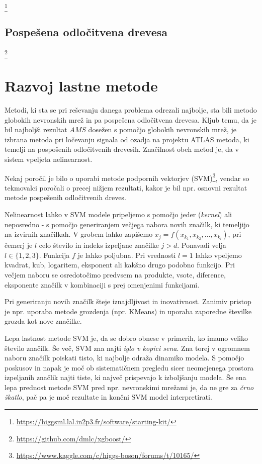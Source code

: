 \documentclass[11pt,a4paper,openany]{book}
\begin{document}
\footnote{\url{https://higgsml.lal.in2p3.fr/software/starting-kit/}}

\section{Pospešena odločitvena drevesa}

\footnote{\url{https://github.com/dmlc/xgboost/}}

	
\chapter{Razvoj lastne metode}
\label{ch:razvoj_lastne_metode}

Metodi, ki sta se pri reševanju danega problema odrezali najbolje, sta bili metodo globokih nevronskih mrež in pa pospešena odločitvena drevesa. Kljub temu, da je bil najboljši rezultat $AMS$ dosežen s pomočjo globokih nevronskih mrež, je izbrana metoda pri ločevanju signala od ozadja na projektu ATLAS metoda, ki temelji na pospošenih odločitvenih drevesih. Značilnost obeh metod je, da v sistem vpeljeta nelinearnost. 

Nekaj poročil je bilo o uporabi metode podpornih vektorjev (SVM)\footnote{\url{https://www.kaggle.com/c/higgs-boson/forums/t/10165/}}, vendar so tekmovalci poročali o precej nižjem rezultati, kakor je bil npr. osnovni rezultat metode pospešenih odločitvenih dreves.

Nelinearnost lahko v SVM modele pripeljemo s pomočjo jeder (\textit{kernel}) ali neposredno - s pomočjo generiranjem večjega nabora novih značilk, ki temeljijo na izvirnih značilkah. V grobem lahko zapišemo $x_j = f(x_{k_1}, x_{k_2}, ..., x_{k_l})$, pri čemerj je $l$ celo število in indeks izpeljane značilke $j > d$. Ponavadi velja $l \in \{1, 2, 3\}$. Funkcija $f$ je lahko poljubna. Pri vrednosti $l = 1$ lahko vpeljemo kvadrat, kub, logaritem, eksponent ali kakšno drugo podobno funkcijo. Pri večjem naboru se osredotočimo predvsem na produkte, vsote, diference, eksponente značilk v kombinaciji s prej omenjenimi funkcijami. 

Pri generiranju novih značilk šteje iznajdljivost in inovativnost. Zanimiv pristop je npr. uporaba metode grozdenja (npr. KMeans) in uporaba zaporedne številke grozda kot nove značilke.

Lepa lastnost metode SVM je, da se dobro obnese v primerih, ko imamo veliko število značilk. Še več, SVM zna najti \textit{iglo v kopici sena}. Zna torej v ogromnem naboru značilk poiskati tisto, ki najbolje odraža dinamiko modela. S pomočjo poskusov in napak je moč ob sistematičnem pregledu sicer neomejenega prostora izpeljanih značlik najti tiste, ki največ prispevajo k izboljšanju modela. Še ena lepa prednost metode SVM pred npr. nevronskimi mrežami je, da ne gre za \textit{črno škatlo}, pač pa je moč rezultate in končni SVM model interpretirati.
\end{document}
